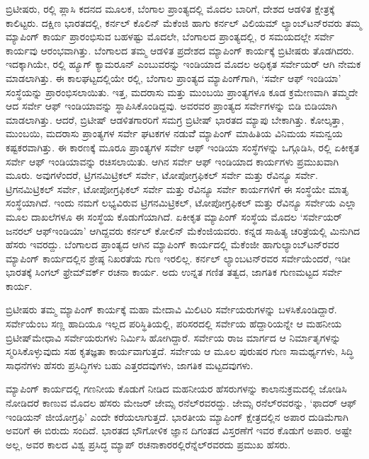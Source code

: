 ಬ್ರಿಟೀಷರು,  ರಲ್ಲಿ ಪ್ಲಾಸಿ ಕದನದ ಮೂಲಕ, ಬೆಂಗಾಲ ಪ್ರಾಂತ್ಯದಲ್ಲಿ ಮೊದಲ ಬಾರಿಗೆ, ದೇಶದ ಆಡಳಿತ ಕ್ಷೇತ್ರಕ್ಕೆ ಕಾಲಿಟ್ಟರು. ದಕ್ಷಿಣ ಭಾರತದಲ್ಲಿ, ಕರ್ನಲ್​ ಕೊಲಿನ್​ ಮೆಕೆಂಜಿ ಹಾಗು ಕರ್ನಲ್​ ವಿಲಿಯಮ್ ಲ್ಯಾಂಬ್​ಟನ್​ರವರು ತಮ್ಮ ಮ್ಯಾಪಿಂಗ್​ ಕಾರ್ಯ ಪ್ರಾರಂಭಿಸುವ ಬಹಳಷ್ಟು ಮೊದಲೇ, ಬೆಂಗಾಲದ ಪ್ರಾಂತ್ಯದಲ್ಲಿ, ರ ಸಮಯದಲ್ಲೇ ಸರ್ವೇ ಕಾರ್ಯವು ಆರಂಭವಾಗಿತ್ತು. ಬೆಂಗಾಲದ ತಮ್ಮ ಆಡಳಿತ ಪ್ರದೇಶದ ಮ್ಯಾಪಿಂಗ್​ ಕಾರ್ಯಕ್ಕೆ ಬ್ರಿಟೀಷರು ತೊಡಗಿದರು. ಇದಕ್ಕಾಗಿಯೇ, ರಲ್ಲಿ ಹ್ಯೂಗ್​ ಕ್ಯಾಮರೂನ್​ ಎಂಬುವರನ್ನು ಇಂಡಿಯಾದ ಮೊದಲ ಅಧಿಕೃತ ಸರ್ವೇಯರ್​ ಆಗಿ ನೇಮಕ ಮಾಡಲಾಗಿತ್ತು. ಈ ಕಾಲಘಟ್ಟದಲ್ಲಿಯೇ ರಲ್ಲಿ, ಬೆಂಗಾಲ ಪ್ರಾಂತ್ಯದ ಮ್ಯಾಪಿಂಗ್​ಗಾಗಿ, ‘ಸರ್ವೇ ಆಫ್​ ಇಂಡಿಯಾ’ ಸಂಸ್ಥೆಯನ್ನು ಪ್ರಾರಂಭಿಸಲಾಯಿತು. ಇತ್ತ, ಮದರಾಸು ಮತ್ತು ಮುಂಬಯಿ ಪ್ರಾಂತ್ಯಗಳೂ ಕೂಡ ಕ್ರಮೇಣವಾಗಿ ತಮ್ಮದೇ ಆದ ಸರ್ವೇ ಆಫ್​ ಇಂಡಿಯಾವನ್ನು ಸ್ಥಾಪಿಸಿಕೊಂಡಿದ್ದವು. ಅವರವರ ಪ್ರಾಂತ್ಯದ ಸರ್ವೇಗಳನ್ನು ಬಿಡಿ ಬಿಡಿಯಾಗಿ ಮಾಡಲಾಗಿತ್ತು. ಆದರೆ, ಬ್ರಿಟೀಷ್​ ಆಡಳಿತಗಾರರಿಗೆ ಸಮಗ್ರ ಬ್ರಿಟೀಷ್​ ಭಾರತದ ಮ್ಯಾಪು ಬೇಕಾಗಿತ್ತು. ಕೋಲ್ಕತ್ತಾ, ಮುಂಬಯಿ, ಮದರಾಸು ಪ್ರಾಂತ್ಯಗಳ ಸರ್ವೇ ಘಟಕಗಳ ನಡುವೆೆ ಮ್ಯಾಪಿಂಗ್​ ಮಾಹಿತಿಯ ವಿನಿಮಯ ಸಮನ್ವಯ ಕಷ್ಟಕರವಾಗಿತ್ತು. ಈ ಕಾರಣಕ್ಕೆ ಮೂರೂ ಪ್ರಾಂತ್ಯಗಳ ಸರ್ವೇ ಆಫ್​ ಇಂಡಿಯಾ ಸಂಸ್ಥೆಗಳನ್ನು ಒಗ್ಗೂಡಿಸಿ, ರಲ್ಲಿ ಏಕೀಕೃತ ಸರ್ವೇ ಆಫ್​ ಇಂಡಿಯಾವನ್ನು ರಚಿಸಲಾಯಿತು. ಆಗಿನ ಸರ್ವೇ ಆಫ್​ ಇಂಡಿಯಾದ ಕಾರ್ಯಗಳು ಪ್ರಮುಖವಾಗಿ ಮೂರು. ಅವುಗಳೆಂದರೆ, ಟ್ರಿಗನಮಿಟ್ರಿಕಲ್​ ಸರ್ವೇ, ಟೋಪೋಗ್ರಫಿಕಲ್​ ಸರ್ವೇ ಮತ್ತು ರೆವಿನ್ಯೂ ಸರ್ವೇ. ಟ್ರಿಗನಮಿಟ್ರಿಕಲ್​ ಸರ್ವೇ, ಟೋಪೋಗ್ರಫಿಕಲ್​ ಸರ್ವೇ ಮತ್ತು ರೆವಿನ್ಯೂ ಸರ್ವೇ ಕಾರ್ಯಗಳಿಗೆ ಈ ಸಂಸ್ಥೆಯೇ ಮಾತೃ ಸಂಸ್ಥೆಯಾಗಿದೆ. ಇಂದು ನಮಗೆ ಲಭ್ಯವಿರುವ ಟ್ರಿಗನಮಿಟ್ರಿಕಲ್​, ಟೋಪೋಗ್ರಫಿಕಲ್​ ಮತ್ತು ರೆವಿನ್ಯೂ ಸರ್ವೇಯ ಎಲ್ಲಾ ಮೂಲ ದಾಖಲೆಗಳೂ ಈ ಸಂಸ್ಥೆಯ ಕೊಡುಗೆಯಾಗಿದೆ. ಏಕೀಕೃತ ಮ್ಯಾಪಿಂಗ್​ ಸಂಸ್ಥೆಯ ಮೊದಲ ‘ಸರ್ವೇಯರ್​ ಜನರಲ್​ ಆಫ್​ ಇಂಡಿಯಾ’ ಆಗಿದ್ದವರು ಕರ್ನಲ್​ ಕೋಲಿನ್​ ಮೆಕೆಂಜಿಯವರು. ಕನ್ನಡ ಸಾಹಿತ್ಯ ಚರಿತ್ರೆಯಲ್ಲಿ ಮಿನುಗಿದ ಹೆಸರು ಇವರದ್ದು. ಬೆಂಗಾಲದ ಪ್ರಾಂತ್ಯದ ಆಗಿನ ಮ್ಯಾಪಿಂಗ್​ ಕಾರ್ಯದಲ್ಲಿ ಮೆಕೆಂಜೀ ಹಾಗು\break ಲ್ಯಾಂಬ್​ಟನ್​ರವರ ಮ್ಯಾಪಿಂಗ್​ ಕಾರ್ಯದಲ್ಲಿನ ಶ್ರೇಷ್ಠ ನಿಖರತೆಯ ಗುಣ ಇರಲಿಲ್ಲ. ಕರ್ನಲ್​ ಲ್ಯಾಂಬಟನ್​ರವರ ಸರ್ವೇಯೆಂದರೆ, ಇಡೀ ಭಾರತಕ್ಕೆ ಸಿಂಗಲ್​ ಫ್ರೇಮ್‌ವರ್ಕ್ ರಚನಾ ಕಾರ್ಯ. ಅದು ಉನ್ನತ ಗಣಿತ ತತ್ವದ, ಜಾಗತಿಕ ಗುಣಮಟ್ಟದ ಸರ್ವೇ ಕಾರ್ಯ.

ಬ್ರಿಟೀಷರು ತಮ್ಮ ಮ್ಯಾಪಿಂಗ್​ ಕಾರ್ಯಕ್ಕೆ ಮಹಾ ಮೇದಾವಿ ಮಿಲಿಟರಿ ಸರ್ವೇಯರುಗಳನ್ನು ಬಳಸಿಕೊಂಡಿದ್ದಾರೆ. ಸರ್ವೇಯೆಂಬ ಸಣ್ಣ ಹಾದಿಯೂ ಇಲ್ಲದ ಪರಿಸ್ಥಿತಿಯಲ್ಲಿ, ಪರಿಸರದಲ್ಲಿ ಸರ್ವೇಯ ಹೆದ್ದಾರಿಯನ್ನೇ ಆ ಮಹನೀಯ ಬ್ರಿಟೀಷ್​ ಮೇಧಾವಿ ಸರ್ವೇಯರುಗಳು ನಿರ್ಮಿಸಿ ಹೋಗಿದ್ದಾರೆ. ಸರ್ವೇಯ ರಾಜ ಮಾರ್ಗದ ಆ ನಿರ್ಮಾತೃಗಳನ್ನು ಸ್ಮರಿಸಿಕೊಳ್ಳುವುದು ಸಹ ಕೃತಜ್ಞತಾ ಕಾರ್ಯವಾಗುತ್ತದೆ. ಸರ್ವೇಯ ಆ ಮೂಲ ಪುರುಷರ ಗುಣ ಸಾಮರ್ಥ್ಯಗಳು, ಸಿದ್ಧಿ ಸಾಧನೆಗಳು ಹೆಸರು ಪ್ರಸಿದ್ಧಿಗಳು ಬಹು ಎತ್ತರದವುಗಳು, ಜಾಗತಿಕ ಮಟ್ಟದವುಗಳು.

ಮ್ಯಾಪಿಂಗ್​ ಕಾರ್ಯದಲ್ಲಿ ಗಣನೀಯ ಕೊಡುಗೆ ನೀಡಿದ ಮಹನೀಯರ ಹೆಸರುಗಳನ್ನು ಕಾಲಾನುಕ್ರಮದಲ್ಲಿ ಜೋಡಿಸಿ ನೋಡಿದರೆ ಕಾಣುವ ಮೊದಲ ಹೆಸರು ಮೇಜರ್​ ಜೇಮ್ಸ ರನೆಲ್​ರವರದ್ದು. ಜೇಮ್ಸ ರನೆಲ್​ರವರನ್ನು, ‘ಫಾದರ್​ ಆಫ್​ ಇಂಡಿಯನ್​ ಜೀಯೋಗ್ರಫಿ’ ಎಂದೇ ಕರೆಯಲಾಗುತ್ತದೆ. ಭಾರತೀಯ ಮ್ಯಾಪಿಂಗ್​ ಕ್ಷೇತ್ರದಲ್ಲಿನ ಅಪಾರ ದುಡಿಮೆಗಾಗಿ ಅವರಿಗೆ ಈ ಬಿರುದು ಸಂದಿದೆ. ಭಾರತದ ಭೌಗೋಳಿಕ ಜ್ಞಾನ ದಿಗಂತದ ವಿಸ್ತರಣೆಗೆ ಇವರ ಕೊಡುಗೆ ಅಪಾರ. ಅಷ್ಟೇ ಅಲ್ಲ, ಅವರ ಕಾಲದ ವಿಶ್ವ ಪ್ರಸಿದ್ಧ ಮ್ಯಾಪ್​ ರಚನಾಕಾರರಲ್ಲಿ\break ರೆನ್ನೆಲ್​ರವರದು ಪ್ರಮುಖ ಹೆಸರು.

